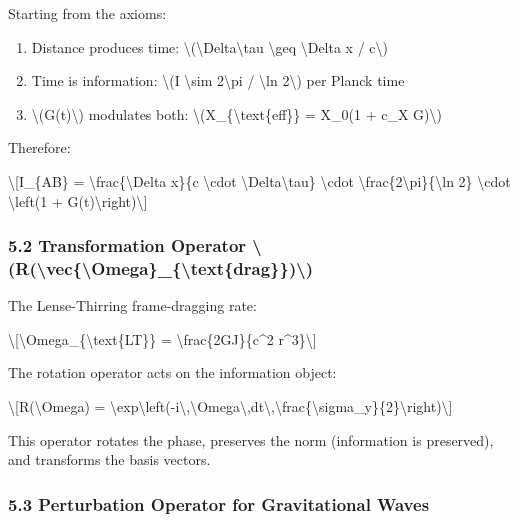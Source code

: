 \documentclass[
  10pt,
]{article}
\providecommand{\tightlist}{%
  \setlength{\itemsep}{0pt}\setlength{\parskip}{0pt}}
\begin{document}
Starting from the axioms:

\begin{enumerate}
\tightlist
\item
  Distance produces time:
  \textbackslash(\textbackslash Delta\textbackslash tau
  \textbackslash geq \textbackslash Delta x / c\textbackslash)
\item
  Time is information: \textbackslash(I \textbackslash sim
  2\textbackslash pi / \textbackslash ln 2\textbackslash) per Planck
  time
\item
  \textbackslash(G(t)\textbackslash) modulates both:
  \textbackslash(X\_\{\textbackslash text\{eff\}\} = X\_0(1 + c\_X
  G)\textbackslash)
\end{enumerate}

Therefore:

\textbackslash{[}I\_\{AB\} = \textbackslash frac\{\textbackslash Delta
x\}\{c \textbackslash cdot \textbackslash Delta\textbackslash tau\}
\textbackslash cdot
\textbackslash frac\{2\textbackslash pi\}\{\textbackslash ln 2\}
\textbackslash cdot \textbackslash left(1 +
G(t)\textbackslash right)\textbackslash{]}

\hypertarget{transformation-operator-rvecomega_textdrag}{%
\subsubsection{5.2 Transformation Operator
\textbackslash(R(\textbackslash vec\{\textbackslash Omega\}\_\{\textbackslash text\{drag\}\})\textbackslash)}\label{transformation-operator-rvecomega_textdrag}}

The Lense-Thirring frame-dragging rate:

\textbackslash{[}\textbackslash Omega\_\{\textbackslash text\{LT\}\} =
\textbackslash frac\{2GJ\}\{c\^{}2 r\^{}3\}\textbackslash{]}

The rotation operator acts on the information object:

\textbackslash{[}R(\textbackslash Omega) =
\textbackslash exp\textbackslash left(-i\textbackslash,\textbackslash Omega\textbackslash,dt\textbackslash,\textbackslash frac\{\textbackslash sigma\_y\}\{2\}\textbackslash right)\textbackslash{]}

This operator rotates the phase, preserves the norm (information is
preserved), and transforms the basis vectors.

\hypertarget{perturbation-operator-for-gravitational-waves}{%
\subsubsection{5.3 Perturbation Operator for Gravitational
Waves}\label{perturbation-operator-for-gravitational-waves}}
\end{document}
